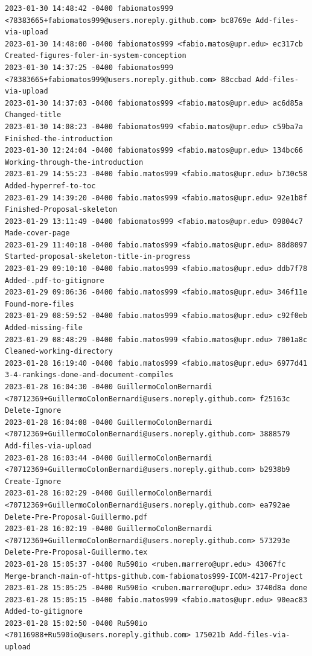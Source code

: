 \documentclass[12pt]{article}
\begin{document}
\begin{verbatim}
2023-01-30 14:48:42 -0400 fabiomatos999 <78383665+fabiomatos999@users.noreply.github.com> bc8769e Add-files-via-upload
2023-01-30 14:48:00 -0400 fabiomatos999 <fabio.matos@upr.edu> ec317cb Created-figures-foler-in-system-conception
2023-01-30 14:37:25 -0400 fabiomatos999 <78383665+fabiomatos999@users.noreply.github.com> 88ccbad Add-files-via-upload
2023-01-30 14:37:03 -0400 fabiomatos999 <fabio.matos@upr.edu> ac6d85a Changed-title
2023-01-30 14:08:23 -0400 fabiomatos999 <fabio.matos@upr.edu> c59ba7a Finished-the-introduction
2023-01-30 12:24:04 -0400 fabiomatos999 <fabio.matos@upr.edu> 134bc66 Working-through-the-introduction
2023-01-29 14:55:23 -0400 fabio.matos999 <fabio.matos@upr.edu> b730c58 Added-hyperref-to-toc
2023-01-29 14:39:20 -0400 fabio.matos999 <fabio.matos@upr.edu> 92e1b8f Finished-Proposal-skeleton
2023-01-29 13:11:49 -0400 fabiomatos999 <fabio.matos@upr.edu> 09804c7 Made-cover-page
2023-01-29 11:40:18 -0400 fabio.matos999 <fabio.matos@upr.edu> 88d8097 Started-proposal-skeleton-title-in-progress
2023-01-29 09:10:10 -0400 fabio.matos999 <fabio.matos@upr.edu> ddb7f78 Added-.pdf-to-gitignore
2023-01-29 09:06:36 -0400 fabio.matos999 <fabio.matos@upr.edu> 346f11e Found-more-files
2023-01-29 08:59:52 -0400 fabio.matos999 <fabio.matos@upr.edu> c92f0eb Added-missing-file
2023-01-29 08:48:29 -0400 fabio.matos999 <fabio.matos@upr.edu> 7001a8c Cleaned-working-directory
2023-01-28 16:19:40 -0400 fabio.matos999 <fabio.matos@upr.edu> 6977d41 3-4-rankings-done-and-document-compiles
2023-01-28 16:04:30 -0400 GuillermoColonBernardi <70712369+GuillermoColonBernardi@users.noreply.github.com> f25163c Delete-Ignore
2023-01-28 16:04:08 -0400 GuillermoColonBernardi <70712369+GuillermoColonBernardi@users.noreply.github.com> 3888579 Add-files-via-upload
2023-01-28 16:03:44 -0400 GuillermoColonBernardi <70712369+GuillermoColonBernardi@users.noreply.github.com> b2938b9 Create-Ignore
2023-01-28 16:02:29 -0400 GuillermoColonBernardi <70712369+GuillermoColonBernardi@users.noreply.github.com> ea792ae Delete-Pre-Proposal-Guillermo.pdf
2023-01-28 16:02:19 -0400 GuillermoColonBernardi <70712369+GuillermoColonBernardi@users.noreply.github.com> 573293e Delete-Pre-Proposal-Guillermo.tex
2023-01-28 15:05:37 -0400 Ru590io <ruben.marrero@upr.edu> 43067fc Merge-branch-main-of-https-github.com-fabiomatos999-ICOM-4217-Project
2023-01-28 15:05:25 -0400 Ru590io <ruben.marrero@upr.edu> 3740d8a done
2023-01-28 15:05:15 -0400 fabio.matos999 <fabio.matos@upr.edu> 90eac83 Added-to-gitignore
2023-01-28 15:02:50 -0400 Ru590io <70116988+Ru590io@users.noreply.github.com> 175021b Add-files-via-upload

\end{verbatim}
\end{document}
